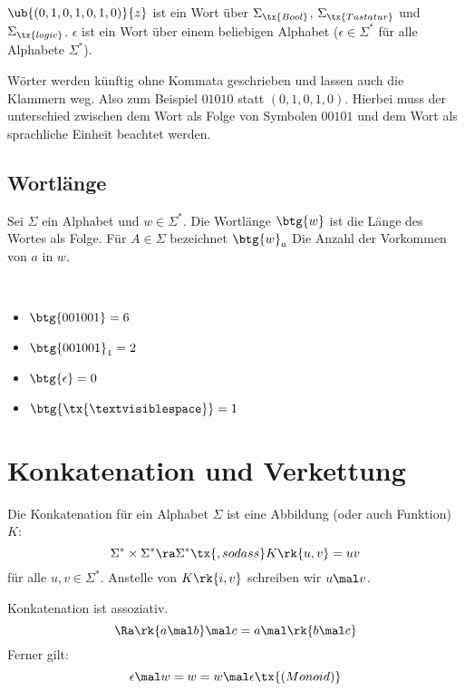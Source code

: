 \begin{example}
$\ub{(0, 1, 0, 1, 0, 1, 0)}{z}$ ist ein Wort über $\Sigma_{\tx{Bool}}$, $\Sigma_{\tx{Tastatur}}$ und $\Sigma_{\tx{logic}}$. $\epsilon$ ist ein Wort über einem beliebigen Alphabet ($\epsilon \in \Sigma^*$ für alle Alphabete $\Sigma^*$).
\end{example}

\begin{notation}
Wörter werden künftig ohne Kommata geschrieben und lassen auch die Klammern weg. Also zum Beispiel $01010$ statt $(0, 1, 0, 1 , 0)$. Hierbei muss der unterschied zwischen dem Wort als Folge von Symbolen $00101$ und dem Wort als sprachliche Einheit  beachtet werden.
\end{notation}

\subsection{Wortlänge}
\begin{definition}[Wortlänge]
Sei $\Sigma$ ein Alphabet und $w \in \Sigma^*$. Die Wortlänge $\btg{w}$ ist die Länge des Wortes als Folge. Für $A \in \Sigma$ bezeichnet $\btg{w}_a$ Die Anzahl der Vorkommen von $a$ in $w$.
\end{definition}

\begin{example}~
\begin{itemize}
\item $\btg{001001} = 6$
\item $\btg{001001}_1 = 2$
\item $\btg{\epsilon} = 0$
\item $\btg{\tx{\textvisiblespace}} = 1$
\end{itemize}
\end{example}

\section{Konkatenation und Verkettung}
\begin{definition}
Die Konkatenation für ein Alphabet $\Sigma$ ist eine Abbildung (oder auch Funktion) $K$:
\[\Sigma^* \times \Sigma^* \ra \Sigma^* \tx{, so dass } K \rk{u, v} = uv\]
für alle $u, v \in \Sigma^*$. Anstelle von $K \rk{i, v}$ schreiben wir $u \mal v$.
\end{definition}

\begin{note}
Konkatenation ist assoziativ.
\[\Ra \rk{a \mal b} \mal c = a \mal \rk{b \mal c}\]
Ferner gilt:
\[\epsilon \mal w = w = w \mal \epsilon \tx{ (Monoid)}\]
\end{note}

